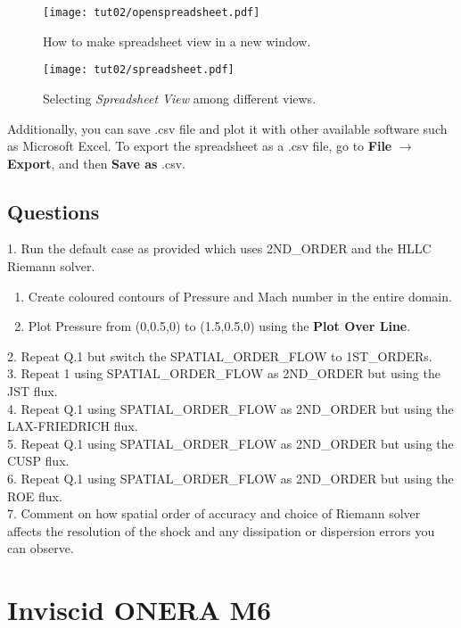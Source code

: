 \begin{figure}[htbp]
    \centering
    \texttt{[image: tut02/openspreadsheet.pdf]}
    \caption{How to make spreadsheet view in a new window.}
    \label{fig2:open_spreadsheet}
\end{figure}
\begin{figure}[htbp]
    \centering
    \texttt{[image: tut02/spreadsheet.pdf]}
    \caption{Selecting \textit{Spreadsheet View} among different views.}
    \label{fig2:spreadsheet}
\end{figure}
Additionally, you can save .csv file and plot it with other available software such as Microsoft Excel. To export the spreadsheet as a .csv file, go to \textbf{File} $\rightarrow$ \textbf{Export}, and then \textbf{Save as} .csv.
\section{Questions}
1. Run the default case as provided which uses 2ND\_ORDER and the HLLC Riemann solver.
\begin{enumerate}[label=(\alph*)]
    \item Create coloured contours of Pressure and Mach number in the entire domain.
    \item Plot Pressure from (0,0.5,0) to (1.5,0.5,0) using the \textbf{Plot Over Line}.
\end{enumerate}
2. Repeat Q.1 but switch the SPATIAL\_ORDER\_FLOW to 1ST\_ORDERs. \\
3. Repeat 1 using SPATIAL\_ORDER\_FLOW as 2ND\_ORDER but using the JST flux. \\
4. Repeat Q.1 using SPATIAL\_ORDER\_FLOW as 2ND\_ORDER but using the LAX-FRIEDRICH flux. \\
5. Repeat Q.1 using SPATIAL\_ORDER\_FLOW as 2ND\_ORDER but using the CUSP flux. \\
6. Repeat Q.1 using SPATIAL\_ORDER\_FLOW as 2ND\_ORDER but using the ROE flux. \\
7. Comment on how spatial order of accuracy and choice of Riemann solver affects the resolution of the shock and any dissipation or dispersion errors you can observe.
\chapter{Inviscid ONERA M6}
\label{ch:Inviscid ONERA M6}
